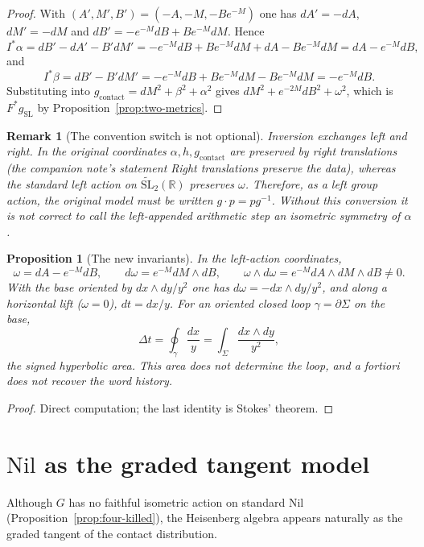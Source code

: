 \documentclass[11pt]{article}
\newtheorem{proposition}[theorem]{Proposition}
\newtheorem{remark}[theorem]{Remark}
\begin{document}
\begin{proof}
With $(A',M',B')=(-A,-M,-Be^{-M})$ one has $dA'=-dA$, $dM'=-dM$ and
$dB'=-e^{-M}dB+Be^{-M}dM$. Hence
\[
I^*\alpha=dB'-dA'-B'dM'
=-e^{-M}dB+Be^{-M}dM+dA-Be^{-M}dM
=dA-e^{-M}dB,
\]
and
\[
I^*\beta=dB'-B'dM'=-e^{-M}dB+Be^{-M}dM-Be^{-M}dM=-e^{-M}dB .
\]
Substituting into $g_{\mathrm{contact}}=dM^2+\beta^2+\alpha^2$ gives
$dM^2+e^{-2M}dB^2+\omega^2$, which is $F^*g_{\mathrm{SL}}$ by
Proposition~\ref{prop:two-metrics}.
\end{proof}

\begin{remark}[The convention switch is not optional]
\label{rem:convention}
Inversion exchanges left and right. In the original coordinates
$\alpha,h,g_{\mathrm{contact}}$ are preserved by \emph{right} translations
(the companion note's statement \emph{Right translations preserve the data}),
whereas the standard left action on
$\widetilde{\mathrm{SL}}_2(\mathbb R)$ preserves $\omega$. Therefore, as a left
group action, the original model must be written $g\cdot p=pg^{-1}$. Without
this conversion it is not correct to call the left-appended arithmetic step an
isometric symmetry of $\alpha$.
\end{remark}

\begin{proposition}[The new invariants]
\label{prop:invariants}
In the left-action coordinates,
\[
\omega=dA-e^{-M}dB,\qquad d\omega=e^{-M}dM\wedge dB,\qquad
\omega\wedge d\omega=e^{-M}dA\wedge dM\wedge dB\ne0 .
\]
With the base oriented by $dx\wedge dy/y^2$ one has
$d\omega=-dx\wedge dy/y^2$, and along a horizontal lift ($\omega=0$), $dt=dx/y$.
For an oriented closed loop $\gamma=\partial\Sigma$ on the base,
\[
\Delta t=\oint_\gamma\frac{dx}{y}=\int_\Sigma\frac{dx\wedge dy}{y^2},
\]
the signed hyperbolic area. This area does not determine the loop, and \emph{a
fortiori} does not recover the word history.
\end{proposition}

\begin{proof}
Direct computation; the last identity is Stokes' theorem.
\end{proof}

\section{\texorpdfstring{$\mathrm{Nil}$}{Nil} as the graded tangent model}
\label{sec:nil}

Although $G$ has no faithful isometric action on standard $\mathrm{Nil}$
(Proposition~\ref{prop:four-killed}), the Heisenberg algebra appears naturally as
the graded tangent of the contact distribution.
\end{document}
